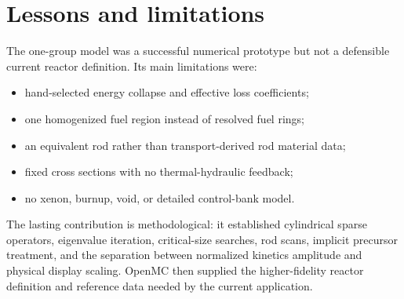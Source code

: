 \documentclass[11pt]{article}
\begin{document}
\section{Lessons and limitations}

The one-group model was a successful numerical prototype but not a defensible
current reactor definition.  Its main limitations were:
\begin{itemize}
  \item hand-selected energy collapse and effective loss coefficients;
  \item one homogenized fuel region instead of resolved fuel rings;
  \item an equivalent rod rather than transport-derived rod material data;
  \item fixed cross sections with no thermal-hydraulic feedback;
  \item no xenon, burnup, void, or detailed control-bank model.
\end{itemize}

The lasting contribution is methodological: it established cylindrical sparse
operators, eigenvalue iteration, critical-size searches, rod scans, implicit
precursor treatment, and the separation between normalized kinetics amplitude
and physical display scaling.  OpenMC then supplied the higher-fidelity
reactor definition and reference data needed by the current application.
\end{document}
